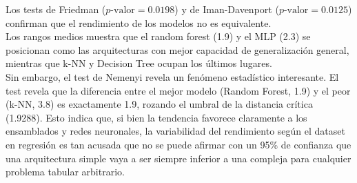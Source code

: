 \documentclass[a4paper,12pt,twoside,final]{book}
\begin{document}
Los tests de Friedman ($p\text{-valor} = 0.0198$) y de Iman-Davenport ($p\text{-valor} = 0.0125$) confirman que el
rendimiento de los modelos no es equivalente.\\

Los rangos medios muestra que el random forest (1.9) y el MLP (2.3) se posicionan como las arquitecturas con mejor
capacidad de generalización general, mientras que k-NN y Decision Tree ocupan los últimos lugares.\\

Sin embargo, el test de Nemenyi revela un fenómeno estadístico interesante. El test revela que la diferencia entre el
mejor modelo (Random Forest, 1.9) y el peor (k-NN, 3.8) es exactamente 1.9, rozando el umbral de la distancia crítica
(1.9288). Esto indica que, si bien la tendencia favorece claramente a los ensamblados y redes neuronales, la variabilidad
del rendimiento según el dataset en regresión es tan acusada que no se puede afirmar con un 95\% de confianza que una
arquitectura simple vaya a ser siempre inferior a una compleja para cualquier problema tabular arbitrario.
\end{document}
